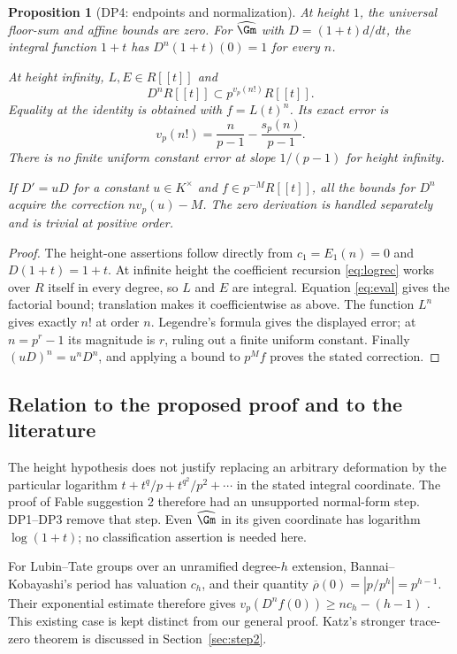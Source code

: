 \documentclass[11pt,a4paper]{article}
\newtheorem{proposition}[theorem]{Proposition}
\theoremstyle{definition}\newtheorem{remark}[theorem]{Remark}
\newcommand{\vp}{v_p}\newcommand{\dR}{\mathrm{dR}}\newcommand{\crys}{\mathrm{crys}}
\begin{document}
\begin{proposition}[DP4: endpoints and normalization]\label{DP4}
At height $1$, the universal floor-sum and affine bounds are zero. For $\widehat\Gm$ with $D=(1+t)d/dt$, the integral function $1+t$ has $D^n(1+t)(0)=1$ for every $n$.

At height infinity, $L,E\in R[[t]]$ and
\[
 D^nR[[t]]\subset p^{\vp(n!)}R[[t]].
\]
Equality at the identity is obtained with $f=L(t)^n$. Its exact error is
\[
 \vp(n!)=\frac{n}{p-1}-\frac{s_p(n)}{p-1}.
\]
There is no finite uniform constant error at slope $1/(p-1)$ for height infinity.

If $D'=uD$ for a constant $u\in K^\times$ and $f\in p^{-M}R[[t]]$, all the bounds for $D^n$ acquire the correction $n\vp(u)-M$. The zero derivation is handled separately and is trivial at positive order.
\end{proposition}
\begin{proof}
The height-one assertions follow directly from $c_1=E_1(n)=0$ and $D(1+t)=1+t$. At infinite height the coefficient recursion \eqref{eq:logrec} works over $R$ itself in every degree, so $L$ and $E$ are integral. Equation \eqref{eq:eval} gives the factorial bound; translation makes it coefficientwise as above. The function $L^n$ gives exactly $n!$ at order $n$. Legendre's formula gives the displayed error; at $n=p^r-1$ its magnitude is $r$, ruling out a finite uniform constant. Finally $(uD)^n=u^nD^n$, and applying a bound to $p^Mf$ proves the stated correction.
\end{proof}

\subsection{Relation to the proposed proof and to the literature}

The height hypothesis does not justify replacing an arbitrary deformation by the particular logarithm $t+t^q/p+t^{q^2}/p^2+\cdots$ in the stated integral coordinate. The proof of Fable suggestion 2 therefore had an unsupported normal-form step. DP1--DP3 remove that step. Even $\widehat\Gm$ in its given coordinate has logarithm $\log(1+t)$; no classification assertion is needed here.

For Lubin--Tate groups over an unramified degree-$h$ extension, Bannai--Kobayashi's period has valuation $c_h$, and their quantity $\overline\rho(0)=|p/p^h|=p^{h-1}$. Their exponential estimate therefore gives $\vp(D^nf(0))\ge nc_h-(h-1)$ \cite[\S2; Propositions 3.3, 3.5]{BK}. This existing case is kept distinct from our general proof. Katz's stronger trace-zero theorem is discussed in Section~\ref{sec:step2}.
\end{document}
